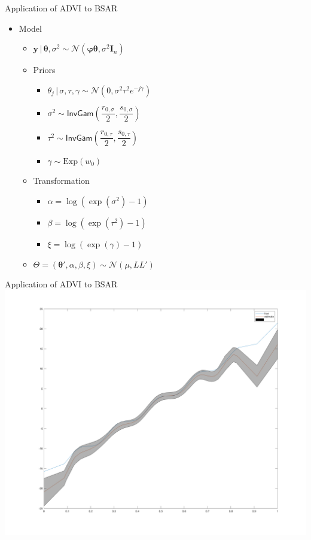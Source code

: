 \documentclass[color=usernames,dvipsnames]{beamer}
\begin{document}
\begin{frame}{Application of ADVI to BSAR}
  \begin{itemize}
    \item<+-> Model
    \begin{itemize}
      \item $\bm{y}\,|\,\bm{\theta},\sigma^{2} \sim \mathcal{N}\left(\bm{\varphi\theta},\sigma^{2}\mathbf{I}_{n}\right)$
      \item Priors
      \begin{itemize}
        \item $\theta_{j}\,|\,\sigma,\tau,\gamma \sim \mathcal{N}\left(0,\sigma^{2}\tau^{2}e^{-j\gamma}\right)$
        \item $\sigma^{2}\sim \mathsf{InvGam}\left(\dfrac{r_{0,\sigma}}{2},\dfrac{s_{0,\sigma}}{2}\right)$
        \item $\tau^{2}\sim \mathsf{InvGam}\left(\dfrac{r_{0,\tau}}{2},\dfrac{s_{0,\tau}}{2}\right)$
        \item $\gamma\sim \mathrm{Exp}(w_{0})$
      \end{itemize}
      \item Transformation
      \begin{itemize}
        \item $\alpha = \log(\exp(\sigma^{2})-1)$
        \item $\beta = \log(\exp(\tau^{2})-1)$
        \item $\xi = \log(\exp(\gamma)-1)$
      \end{itemize}
      \item $\Theta = (\bm{\theta}',\alpha,\beta,\xi)\sim \mathcal{N}(\mu,LL')$
    \end{itemize}
  \end{itemize}
\end{frame}
\begin{frame}{Application of ADVI to BSAR}
  \includegraphics[scale=0.13]{CI_VB.png}
\end{frame}
\end{document}

